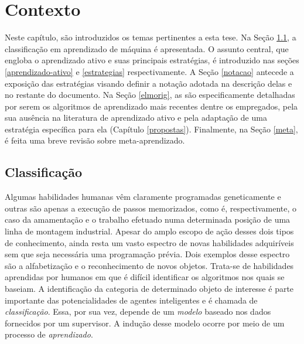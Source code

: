\chapter{Contexto} \label{contexto}
Neste capítulo, são introduzidos os temas pertinentes a esta tese.
Na Seção \ref{apsup},
a classificação em aprendizado de máquina é apresentada.
O assunto central, que engloba o aprendizado ativo e suas principais estratégias,
é introduzido nas seções \ref{aprendizado-ativo} e \ref{estrategias} respectivamente.
A Seção \ref{notacao} antecede a exposição das estratégias visando
definir a notação adotada na descrição delas e no restante do documento.
Na Seção \ref{elmorig}, as \elms são especificamente detalhadas por serem os algoritmos
de aprendizado mais recentes dentre os empregados, pela sua ausência na literatura de
aprendizado ativo e pela adaptação de uma estratégia específica para ela (Capítulo \ref{propostas}).
Finalmente, na Seção \ref{meta}, é feita uma breve revisão sobre meta-aprendizado.
% 

\section{Classificação}\label{apsup}
Algumas habilidades humanas vêm claramente programadas geneticamente
e outras são apenas a execução de passos memorizados,
como é, respectivamente, o caso da amamentação e o trabalho efetuado numa
determinada posição de uma linha de montagem industrial.
Apesar do amplo escopo de ação desses dois tipos de conhecimento,
ainda resta um vasto espectro de novas habilidades adquiríveis
sem que seja necessária uma programação prévia.
Dois exemplos desse espectro são a alfabetização e
o reconhecimento de novos objetos.
Trata-se de habilidades aprendidas por humanos em que é difícil
identificar os algoritmos nos quais se baseiam.
A identificação da categoria de determinado objeto de interesse
é parte importante das potencialidades
de agentes inteligentes e é chamada de \textit{classificação}.
Essa, por sua vez, depende de um \textit{modelo} baseado nos
dados fornecidos por um supervisor.
A indução desse modelo ocorre por meio de um processo de \textit{aprendizado}.

